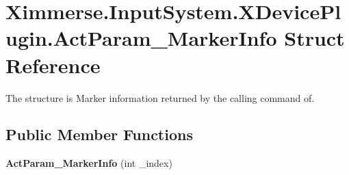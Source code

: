 \hypertarget{struct_ximmerse_1_1_input_system_1_1_x_device_plugin_1_1_act_param___marker_info}{}\section{Ximmerse.\+Input\+System.\+X\+Device\+Plugin.\+Act\+Param\+\_\+\+Marker\+Info Struct Reference}
\label{struct_ximmerse_1_1_input_system_1_1_x_device_plugin_1_1_act_param___marker_info}


The structure is Marker information returned by the calling command of.  


\subsection*{Public Member Functions}
\begin{DoxyCompactItemize}
\item 
\mbox{\label{struct_ximmerse_1_1_input_system_1_1_x_device_plugin_1_1_act_param___marker_info_a839f11b5a97f75aa08c2a3e324dfc0d7}} 
{\bfseries Act\+Param\+\_\+\+Marker\+Info} (int \+\_\+index)
\end{DoxyCompactItemize}
